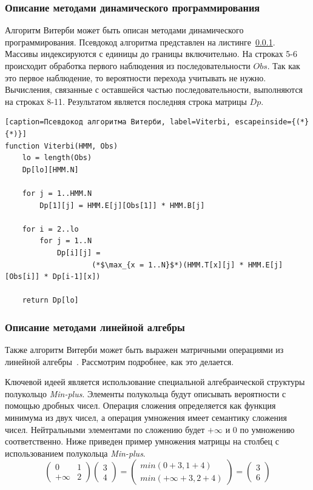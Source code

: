 \subsubsection{Описание методами динамического программирования}
\label{lab:dyn_Viterbi}
Алгоритм Витерби может быть описан методами динамического программирования.
Псевдокод алгоритма представлен на листинге~\ref{lab:dyn_Viterbi}.
Массивы индексируются с единицы до границы включительно.
На строках 5-6 происходит обработка первого наблюдения из последовательности $Obs$.
Так как это первое наблюдение, то вероятности перехода учитывать не нужно.
Вычисления, связанные с оставшейся частью последовательности, выполняются на строках 8-11.
Результатом является последняя строка матрицы $Dp$.
\begin{lstlisting}[caption=Псевдокод алгоритма Витерби, label=Viterbi, escapeinside={(*}{*)}]
function Viterbi(HMM, Obs)
	lo = length(Obs)
	Dp[lo][HMM.N]

	for j = 1..HMM.N
		Dp[1][j] = HMM.E[j][Obs[1]] * HMM.B[j]
	
	for i = 2..lo
		for j = 1..N
			Dp[i][j] = 
					(*$\max_{x = 1..N}$*)(HMM.T[x][j] * HMM.E[j][Obs[i]] * Dp[i-1][x])

	return Dp[lo]
\end{lstlisting}


\subsubsection{Описание методами линейной алгебры}
\label{lab:LA_Viterbi}
Также алгоритм Витерби может быть выражен матричными 
операциями из линейной алгебры~\cite{LA_Viterbi}.
Рассмотрим подробнее, как это делается.

Ключевой идеей является использование специальной 
алгебраической структуры полукольцо \emph{Min-plus}.
Элементы полукольца будут описывать вероятности с
помощью дробных чисел.
Операция сложения определяется как функция
минимума из двух чисел, а операция умножения имеет семантику
сложения чисел.
Нейтральными элементами по сложению будет $+\infty$ 
и 0 по умножению соответственно.
Ниже приведен пример умножения матрицы на столбец 
с использованием полукольца \emph{Min-plus}.
\[
  \begin{pmatrix}
    0 & 1 \\
    +\infty & 2
  \end{pmatrix}
  \begin{pmatrix}
    3 \\
    4
  \end{pmatrix}
  =
  \begin{pmatrix}
    min(0 + 3, 1 + 4) \\
    min(+\infty + 3, 2 + 4)
  \end{pmatrix}
  =
  \begin{pmatrix}
    3 \\
    6
  \end{pmatrix}
\]

